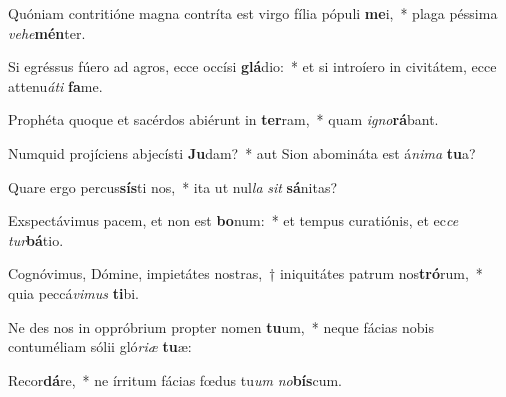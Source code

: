 \item Quóniam contritióne magna contríta est virgo fília pópuli \textbf{me}i,~* plaga péssima \textit{ve}\textit{he}\textbf{mén}ter.
\item Si egréssus fúero ad agros, ecce occísi \textbf{glá}dio:~* et si introíero in civitátem, ecce attenu\textit{á}\textit{ti} \textbf{fa}me.
\item Prophéta quoque et sacérdos abiérunt in \textbf{ter}ram,~* quam \textit{i}\textit{gno}\textbf{rá}bant.
\item Numquid projíciens abjecísti \textbf{Ju}dam?~* aut Sion abomináta est á\textit{ni}\textit{ma} \textbf{tu}a?
\item Quare ergo percus\textbf{sís}ti nos,~* ita ut nul\textit{la} \textit{sit} \textbf{sá}nitas?
\item Exspectávimus pacem, et non est \textbf{bo}num:~* et tempus curatiónis, et ec\textit{ce} \textit{tur}\textbf{bá}tio.
\item Cognóvimus, Dómine, impietátes nostras,~† iniquitátes patrum nos\textbf{tró}rum,~* quia peccá\textit{vi}\textit{mus} \textbf{ti}bi.
\item Ne des nos in oppróbrium propter nomen \textbf{tu}um,~* neque fácias nobis contuméliam sólii gló\textit{ri}\textit{æ} \textbf{tu}æ:
\item Recor\textbf{dá}re,~* ne írritum fácias fœdus tu\textit{um} \textit{no}\textbf{bís}cum.
